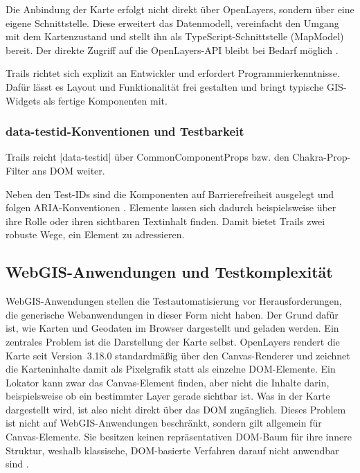 Die Anbindung der Karte erfolgt nicht direkt über OpenLayers, sondern über eine eigene Schnittstelle. Diese erweitert das Datenmodell, vereinfacht den Umgang mit dem Kartenzustand und stellt ihn als TypeScript-Schnittstelle (MapModel) bereit. Der direkte Zugriff auf die OpenLayers-\ac{API} bleibt bei Bedarf möglich \parencite{52north_gmbh_open_2025}.

Trails richtet sich explizit an Entwickler und erfordert Programmierkenntnisse. Dafür lässt es Layout und Funktionalität frei gestalten und bringt typische \ac{GIS}-Widgets als fertige Komponenten mit.

\subsubsection{data-testid-Konventionen und Testbarkeit}

Trails reicht \code|data-testid| über CommonComponentProps \parencite[react-utils]{open_pioneer_open-pioneerreact-utils_nodate} bzw. den Chakra-Prop-Filter \parencite{chakra_systems_chakra_2026} ans \ac{DOM} weiter.

Neben den Test-IDs sind die Komponenten auf Barrierefreiheit ausgelegt und folgen \ac{ARIA}-Konventionen \parencite{52north_gmbh_open_2025}. Elemente lassen sich dadurch beispielsweise über ihre Rolle oder ihren sichtbaren Textinhalt finden. Damit bietet Trails zwei robuste Wege, ein Element zu adressieren.

\subsection{WebGIS-Anwendungen und Testkomplexität}

WebGIS-Anwendungen stellen die Testautomatisierung vor Herausforderungen, die generische Webanwendungen in dieser Form nicht haben. Der Grund dafür ist, wie Karten und Geodaten im Browser dargestellt und geladen werden. Ein zentrales Problem ist die Darstellung der Karte selbst. OpenLayers rendert die Karte seit Version~3.18.0 standardmäßig über den Canvas-Renderer \parencite{openlayers_upgrade_2026} und zeichnet die Karteninhalte damit als Pixelgrafik statt als einzelne \ac{DOM}-Elemente. Ein Lokator kann zwar das Canvas-Element finden, aber nicht die Inhalte darin, beispielsweise ob ein bestimmter Layer gerade sichtbar ist. Was in der Karte dargestellt wird, ist also nicht direkt über das \ac{DOM} zugänglich. Dieses Problem ist nicht auf WebGIS-Anwendungen beschränkt, sondern gilt allgemein für Canvas-Elemente. Sie besitzen keinen repräsentativen \ac{DOM}-Baum für ihre innere Struktur, weshalb klassische, \ac{DOM}-basierte Verfahren darauf nicht anwendbar sind \parencite[S.~1]{bajammal_web_2018}.

